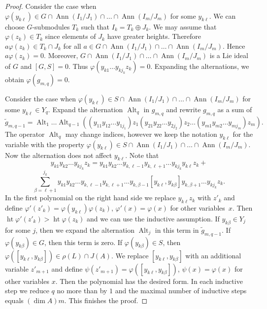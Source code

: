 \documentclass[12pt, reqno, a4paper]{amsart}
\theoremstyle{plain}
\theoremstyle{remark}
\theoremstyle{definition}
\begin{document}
\begin{proof}
Consider the case when $\varphi(y_{k\ell}) \in G \cap \operatorname{Ann}(I_1/J_1) \cap \ldots \cap \operatorname{Ann}(I_m/J_m)$
for some $y_{k\ell}$.
We can choose $G$-submodules $T_k$ such that
$I_k = T_k \oplus J_k$. We may assume
that $\varphi(z_k) \in T_k$ since elements of $J_k$ have greater heights.
Therefore $a\varphi(z_k) \in T_k \cap J_k$ for all $a \in G \cap \operatorname{Ann}(I_1/J_1) \cap \ldots \cap \operatorname{Ann}(I_m/J_m)$.
Hence $a\varphi(z_k)=0$. Moreover, $G \cap \operatorname{Ann}(I_1/J_1) \cap \ldots \cap \operatorname{Ann}(I_m/J_m)$
is a Lie ideal of $G$ and $[G,S]=0$. Thus
$\varphi(y_{k1}\ldots y_{kj_k}z_k) = 0$.
Expanding the alternations, we obtain $\varphi(g_{m,q})=0$.

Consider the case when $\varphi(y_{k\ell}) \in S \cap \operatorname{Ann}(I_1/J_1) \cap \ldots \cap \operatorname{Ann}(I_m/J_m)$
for some $y_{k\ell} \in Y_q$. Expand the alternation $\operatorname{Alt}_q$ in $g_{m,q}$
and rewrite $g_{m,q}$ as a sum of
$$\tilde g_{m,q-1} =\operatorname{Alt}_{1} \ldots \operatorname{Alt}_{q-1} ((y_{11}y_{12} \ldots y_{1j_1}) z_1
 (y_{21}y_{22}\ldots y_{2j_2}) z_2 \ldots (y_{m1}y_{m2} \ldots y_{mj_m}) z_m).$$
 The operator $\operatorname{Alt}_q$ may change indices, however we
 keep the notation $y_{k\ell}$ for the variable with the property
 $\varphi(y_{k\ell}) \in S \cap \operatorname{Ann}(I_1/J_1) \cap \ldots \cap \operatorname{Ann}(I_m/J_m)$.
Now the alternation does not affect $y_{k\ell}$.
Note that $$y_{k1}y_{k2}\ldots y_{k j_k} z_k
= y_{k1} y_{k2} \ldots y_{k,{\ell-1}}
y_{k,{\ell+1}}\ldots y_{k j_k} y_{k\ell} z_k
+$$ $$
\sum\limits_{\beta=\ell+1}^{j_k}
y_{k1} y_{k2} \ldots y_{k,{\ell-1}}
 y_{k,{\ell+1}}
\ldots y_{k,{\beta-1}} [y_{k\ell},y_{k\beta}]
y_{k,{\beta+1}}\ldots y_{kj_k} z_k.$$
In the first polynomial on the right hand side we replace $y_{k\ell} z_k$
with $z'_k$ and define $\varphi'(z'_k)
= \varphi(y_{k\ell}) \varphi(z_k)$, $\varphi'(x) = \varphi(x)$ for other
variables~$x$. Then $\operatorname{ht}\varphi'(z'_k) >
\operatorname{ht}\varphi(z_k)$ and we can use the inductive assumption.
If $y_{k\beta}\in Y_j$ for some $j$, then we expand the alternation $\operatorname{Alt}_j$
in this term in $\tilde g_{m,q-1}$.
If $\varphi(y_{k\beta}) \in G$, then this term is zero.
If $\varphi(y_{k\beta}) \in S$, then $\varphi([y_{k\ell},y_{k\beta}]) \in \rho(L) \cap J(A)$.
We replace $[y_{k\ell},y_{k\beta}]$ with an additional variable $z'_{m+1}$
and define $\psi(z'_{m+1})=\varphi([y_{k\ell},y_{k\beta}])$, $\psi(x)=\varphi(x)$
for other variables $x$.
Then the polynomial has the desired form. In each inductive step
we reduce $q$ no more than by $1$ and the maximal number of
inductive steps equals $(\dim A)m$. This finishes the proof.
\end{proof}
\end{document}
